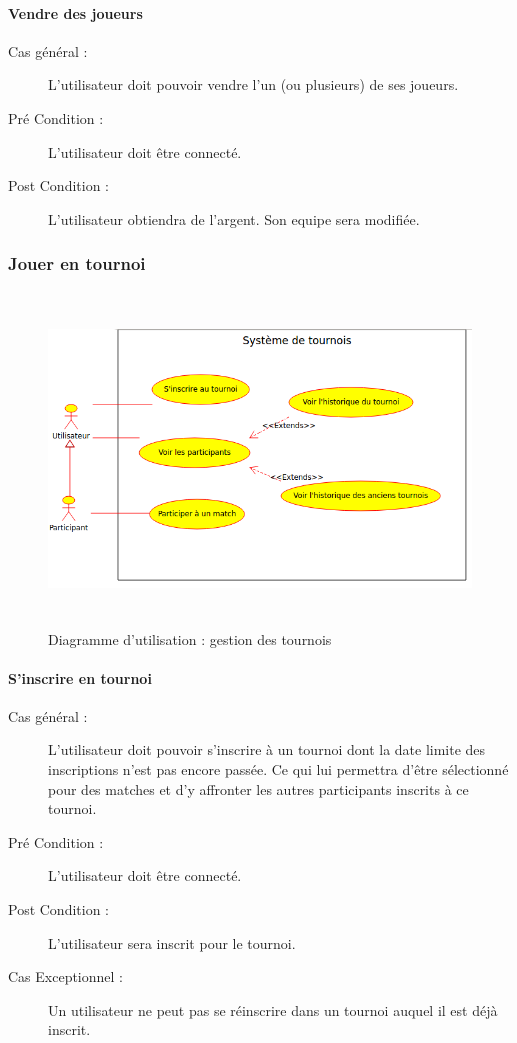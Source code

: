 \documentclass[a4paper]{article}
\begin{document}
\paragraph{Vendre des \glspl{joueur}}
\begin{description}
    \item[Cas général :] L'\gls{utilisateur} doit pouvoir vendre l'un (ou plusieurs) de ses \glspl{joueur}.
    \item[Pré Condition  :] L'\gls{utilisateur} doit être connecté.
    \item[Post Condition :] L'\gls{utilisateur} obtiendra de l'argent. Son \gls{equipe} sera modifiée.
\end{description}

\subsubsection{Jouer en tournoi}
\begin{figure}[H]
   \begin{center}
   \caption{\label{diag-use-championship} Diagramme d'utilisation : gestion des tournois}
   \includegraphics[height=250pt]{uml/usrTournoi.png}
   \end{center}
\end{figure}
\paragraph{S'inscrire en tournoi}
\begin{description}
\item[Cas général :] L'\gls{utilisateur} doit pouvoir s'inscrire à un tournoi dont la date limite des inscriptions n'est pas encore passée.
Ce qui lui permettra d'être sélectionné pour des matches et d'y affronter les autres \glspl{participant} inscrits à ce tournoi.
\item[Pré Condition  :] L'\gls{utilisateur} doit être connecté.
\item[Post Condition :] L'\gls{utilisateur} sera inscrit pour le tournoi.
\item[Cas Exceptionnel :] Un \gls{utilisateur} ne peut pas se réinscrire dans un tournoi auquel il est déjà inscrit.
\end{description} 
\end{document}
